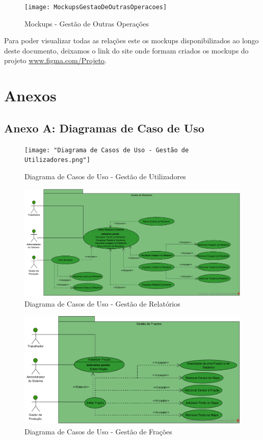 \documentclass{scrreprt}
\begin{document}
	\begin{figure}[!h]
		\centering
		\texttt{[image: MockupsGestaoDeOutrasOperacoes]}
		\caption{Mockups - Gestão de Outras Operações}
		\label{fig:mockupsgestaodeoutrasoperacoes}
	\end{figure}
	
	Para poder visualizar todas as relações este os mockups disponibilizados ao longo deste documento, deixamos o link do site onde formam criados os mockups do projeto \href{https://www.figma.com/file/64FxVuM0BBvMAQNQz9qsxQ/AgroLink---Mockups?type=design&mode=design&t=a60q5ceoFfV1y99Z-1}{www.figma.com/Projeto}.
	
	
	\chapter{Anexos}
	
	\section{Anexo A: Diagramas de Caso de Uso}
	
	\begin{figure}[!h]
		\centering
		\texttt{[image: "Diagrama de Casos de Uso - Gestão de Utilizadores.png"]}
		\caption{Diagrama de Casos de Uso - Gestão de Utilizadores}
		\label{fig:Diagrama de-casos-de-uso---gestao-de-utilizadores}
	\end{figure}
	
	\begin{figure}[!h]
		\centering
		\includegraphics[width=0.8\linewidth]{"Diagrama de Casos de Uso - Gestão de Relatórios.png"}
		\caption{Diagrama de Casos de Uso - Gestão de Relatórios}
		\label{fig:diagrama-de-casos-de-uso---gestao-de-relatorios}
	\end{figure}
	
	\begin{figure}[!h]
		\centering
		\includegraphics[width=0.8\linewidth]{"Diagrama de Casos de Uso - Gestão de Frações.png"}
		\caption{Diagrama de Casos de Uso - Gestão de Frações}
		\label{fig:diagrama-de-casos-de-uso---gestao-de-fracoes}
	\end{figure}
	
\end{document}
